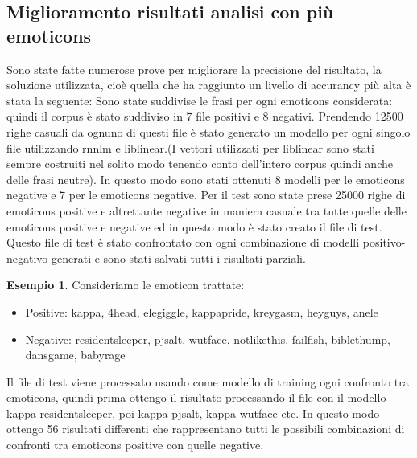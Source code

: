 \documentclass[a4paper,12pt,openright,twoside]{report}
\theoremstyle{definition}
\newtheorem{es}{Esempio}[section]
\begin{document}
\subsection{Miglioramento risultati analisi con più emoticons}
Sono state fatte numerose prove per migliorare la precisione del risultato, la soluzione utilizzata, cioè quella che ha raggiunto un livello di accurancy più alta è stata la seguente:
Sono state suddivise le frasi per ogni emoticons considerata: quindi il corpus è stato suddiviso in 7 file positivi e 8 negativi. Prendendo 12500 righe casuali da ognuno di questi file è stato generato un modello per ogni singolo file utilizzando rnnlm e liblinear.(I vettori utilizzati per liblinear sono stati sempre costruiti nel solito modo tenendo conto dell'intero corpus quindi anche delle frasi neutre). In questo modo sono stati ottenuti 8 modelli per le emoticons negative e 7 per le emoticons negative.
Per il test sono state prese 25000 righe di emoticons positive e altrettante negative in maniera casuale tra tutte quelle delle emoticons positive e negative ed in questo modo è stato creato il file di test. Questo file di test è stato confrontato con ogni combinazione di modelli positivo-negativo generati e sono stati salvati tutti i risultati parziali.
\begin{es}
Consideriamo le emoticon trattate:
\begin{itemize}
\item Positive: kappa, 4head, elegiggle, kappapride, kreygasm, heyguys, anele
\item Negative: residentsleeper, pjsalt, wutface, notlikethis, failfish, biblethump, dansgame, babyrage
\end{itemize}
Il file di test viene processato usando come modello di training ogni confronto tra emoticons, quindi prima ottengo il risultato processando il file con il modello kappa-residentsleeper, poi kappa-pjsalt, kappa-wutface etc. In questo modo ottengo 56 risultati differenti che rappresentano tutti le possibili combinazioni di confronti tra emoticons positive con quelle negative.
\end{es}
\end{document}

